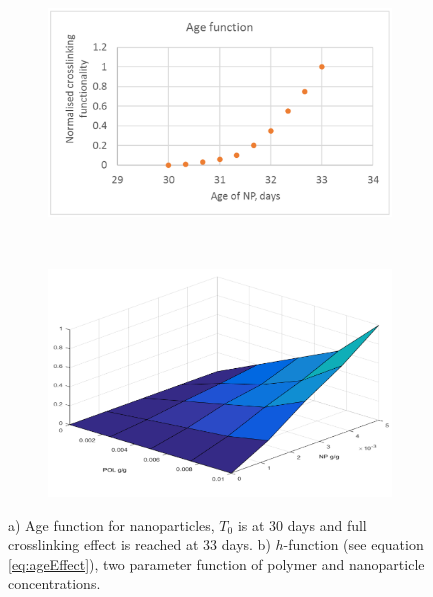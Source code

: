 \documentclass[journal = enfuem, manuscript =  article]{achemso}
\begin{document}
\begin{figure}[h] %
    \begin{subfigure}{.5\textwidth}
    \centering
    \includegraphics[width=\textwidth]{fig/ageFunc.png}
    \caption{}
    \label{cht:ageFunc}
    \end{subfigure}
    \\
    \begin{subfigure}{.5\textwidth}
    \centering
    \includegraphics[width=\textwidth]{fig/hFunc.png}
    \caption{}
    \label{cht:hFunc}
    \end{subfigure}
    
    \caption{a) Age function for nanoparticles, $T_0$ is at 30 days and full crosslinking effect is reached at 33 days. b) $h$-function (see equation \ref{eq:ageEffect}), two parameter function of polymer and nanoparticle concentrations. }
    \label{cht:ageAndH}
\end{figure}
\end{document}
